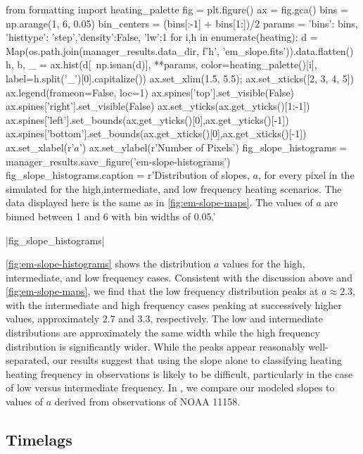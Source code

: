 \begin{pycode}
from formatting import heating_palette
fig = plt.figure()
ax = fig.gca()
bins = np.arange(1, 6, 0.05)
bin_centers = (bins[:-1] + bins[1:])/2
params = {'bins': bins, 'histtype': 'step','density':False, 'lw':1}
for i,h in enumerate(heating):
    d = Map(os.path.join(manager_results.data_dir, f'{h}', 'em_slope.fits')).data.flatten()
    h, b, _ = ax.hist(d[~np.isnan(d)], **params, color=heating_palette()[i],
                      label=h.split('_')[0].capitalize())
ax.set_xlim(1.5, 5.5);
ax.set_xticks([2, 3, 4, 5])
ax.legend(frameon=False, loc=1)
ax.spines['top'].set_visible(False)
ax.spines['right'].set_visible(False)
ax.set_yticks(ax.get_yticks()[1:-1])
ax.spines['left'].set_bounds(ax.get_yticks()[0],ax.get_yticks()[-1])
ax.spines['bottom'].set_bounds(ax.get_xticks()[0],ax.get_xticks()[-1])
ax.set_xlabel(r'$a$')
ax.set_ylabel(r'Number of Pixels')
fig_slope_histograms = manager_results.save_figure('em-slope-histograms')
fig_slope_histograms.caption = r'Distribution of \dem{} slopes, $a$, for every pixel in the simulated \AR{} for the high,intermediate, and low frequency heating scenarios. The data displayed here is the same as in \autoref{fig:em-slope-maps}. The values of $a$ are binned between 1 and 6 with bin widths of 0.05.'
\end{pycode}
|fig_slope_histograms|

\autoref{fig:em-slope-histograms} shows the distribution $a$ values for the high, intermediate, and low frequency cases. Consistent with the discussion above and \autoref{fig:em-slope-maps}, we find that the low frequency distribution peaks at $a\approx2.3$, with the intermediate and high frequency cases peaking at successively higher values, approximately 2.7 and 3.3, respectively. The low and intermediate distributions are approximately the same width while the high frequency distribution is significantly wider. While the peaks appear reasonably well-separated, our results suggest that using the \dem{} slope alone to classifying heating heating frequency in observations is likely to be difficult, particularly in the case of low versus intermediate frequency. In , we compare our modeled \dem{} slopes to values of $a$ derived from observations of NOAA 11158.


\subsection{Timelags}\label{timelags}

